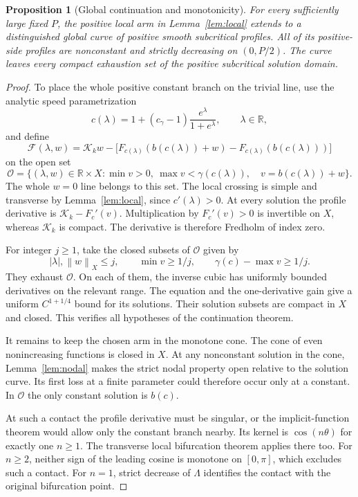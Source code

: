 \documentclass[11pt,a4paper]{article}
\newtheorem{proposition}[theorem]{Proposition}
\theoremstyle{remark}
\newcommand{\R}{\mathbb R}
\newcommand{\K}{\mathcal K}
\newcommand{\F}{\mathcal F}
\newcommand{\cg}{c_\gamma}
\newcommand{\norm}[1]{\left\lVert#1\right\rVert}
\begin{document}
\begin{proposition}[Global continuation and monotonicity]\label{prop:global}
For every sufficiently large fixed $P$, the positive local arm in
Lemma~\ref{lem:local} extends to a distinguished global curve of positive
smooth subcritical profiles. All of its positive-side profiles are
nonconstant and strictly decreasing on $(0,P/2)$. The curve leaves every
compact exhaustion set of the positive subcritical solution domain.
\end{proposition}
\begin{proof}
To place the whole positive constant branch on the trivial line, use the
analytic speed parametrization
\[
 c(\lambda)=1+(\cg-1)\frac{e^\lambda}{1+e^\lambda},\qquad\lambda\in\R,
\]
and define
\[
 \F(\lambda,w)=\K_kw-
  \bigl[F_{c(\lambda)}(b(c(\lambda))+w)-F_{c(\lambda)}(b(c(\lambda)))\bigr]
\]
on the open set
\[
 \mathcal O=\{(\lambda,w)\in\R\times X:
     \min v>0,\ \max v<\gamma(c(\lambda)),\quad v=b(c(\lambda))+w\}.
\]
The whole $w=0$ line belongs to this set. The local crossing is simple
and transverse by Lemma~\ref{lem:local}, since $c'(\lambda)>0$.
At every solution the profile derivative is $\K_k-F_c'(v)$.
Multiplication by $F_c'(v)>0$ is invertible on $X$, whereas $\K_k$ is
compact. The derivative is therefore Fredholm of index zero.

For integer $j\ge1$, take the closed subsets of $\mathcal O$ given by
\[
 |\lambda|,\norm{w}_X\le j,\qquad
 \min v\ge1/j,\qquad \gamma(c)-\max v\ge1/j.
\]
They exhaust $\mathcal O$. On each of them, the inverse cubic has
uniformly bounded derivatives on the relevant range. The equation and
the one-derivative gain give a uniform $C^{1+1/4}$ bound for its
solutions. Their solution subsets are compact in $X$ and closed. This
verifies all hypotheses of the continuation theorem.

It remains to keep the chosen arm in the monotone cone. The cone of even
nonincreasing functions is closed in $X$. At any nonconstant solution in
the cone, Lemma~\ref{lem:nodal} makes the strict nodal property open
relative to the solution curve. Its first loss at a finite parameter
could therefore occur only at a constant. In $\mathcal O$ the only
constant solution is $b(c)$.

At such a contact the profile derivative must be singular, or the
implicit-function theorem would allow only the constant branch nearby.
Its kernel is $\cos(n\theta)$ for exactly one $n\ge1$. The transverse
local bifurcation theorem applies there too. For $n\ge2$, neither sign of
the leading cosine is monotone on $[0,\pi]$, which excludes such a
contact. For $n=1$, strict decrease of $\Lambda$ identifies the contact
with the original bifurcation point.


\end{proof}
\end{document}
